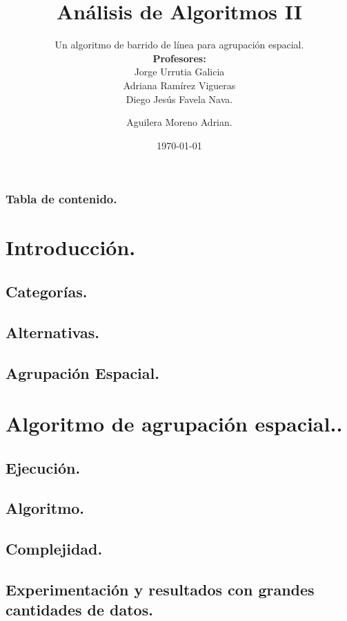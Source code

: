 \documentclass[9pt]{beamer}
\title{Análisis de Algoritmos II}
\subtitle{Un algoritmo de barrido de línea para agrupación espacial.\\
  \textbf{Profesores:}\\
  Jorge Urrutia Galicia\\
  Adriana Ramírez Vigueras\\
  Diego Jesús Favela Nava.}
\author{Aguilera Moreno Adrian.}
\institute{Facultad de Ciencias, UNAM}
\date{\today}
\begin{document}
\titlepage

\begin{frame}
 \frametitle{Tabla de contenido.}
 \tableofcontents
\end{frame}
%
\section{Introducción.}


\subsection{Categorías.}


\subsection{Alternativas.}


\subsection{Agrupación Espacial.}



\section{Algoritmo de agrupación espacial..}
\subsection{Ejecución.}






\subsection{Algoritmo.}



\subsection{Complejidad.}

\subsection{Experimentación y resultados con grandes cantidades de datos.}



\end{document}
